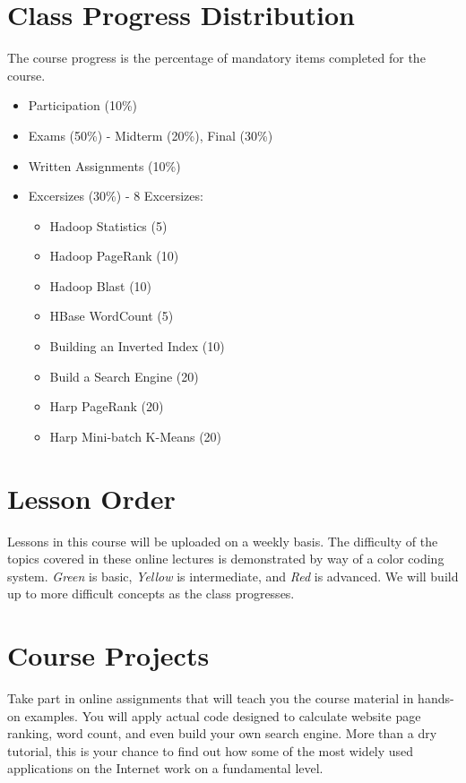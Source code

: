 \section{Class Progress Distribution}

The course progress is the percentage of mandatory items completed for
the course.

\begin{itemize}
  \item Participation (10\%)
  \item Exams (50\%) - Midterm (20\%), Final (30\%)
  \item Written Assignments (10\%)
  \item Excersizes (30\%) - 8 Excersizes: 
    \begin{itemize}
      \item Hadoop Statistics (5)
      \item Hadoop PageRank (10)
      \item Hadoop Blast (10)
      \item HBase WordCount (5)
      \item Building an Inverted Index (10)
      \item Build a Search Engine (20)
      \item Harp PageRank (20)
      \item Harp Mini-batch K-Means (20)
    \end{itemize}
\end{itemize}

\section{Lesson Order}

Lessons in this course will be uploaded on a weekly basis. The
difficulty of the topics covered in these online lectures is
demonstrated by way of a color coding system. \textit{Green} is basic,
\textit{Yellow} is intermediate, and \textit{Red} is advanced. We will build
up to more difficult concepts as the class progresses.

\section{Course Projects}

Take part in online assignments that will teach you the course
material in hands-on examples. You will apply actual code designed to
calculate website page ranking, word count, and even build your own
search engine. More than a dry tutorial, this is your chance to find
out how some of the most widely used applications on the Internet work
on a fundamental level.


